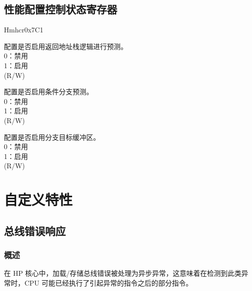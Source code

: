 \documentclass[main\_\_CN.tex]{subfiles}
\begin{document}
 \subsection{性能配置控制状态寄存器}
\label{sec:riscvcpu-perf-csr}
\begin{register}{H}{mhcr}{0x7C1}\label{regdesc:MHCR}
%
%
%
%
%
%
\regnewline%
\begin{regdesc}\begin{reglist}
\label{fielddesc:MHCRRS}\item [RS] 配置是否启用返回地址栈逻辑进行预测。\\
0：禁用 \\
1：启用 \\
(R/W)
\label{fielddesc:MHCRBPE}\item [BPE] 配置是否启用条件分支预测。\\
0：禁用 \\
1：启用 \\
(R/W)
\label{fielddesc:MHCRBTB}\item [BTB]配置是否启用分支目标缓冲区。\\
0：禁用 \\
1：启用 \\
(R/W)
\end{reglist}\end{regdesc}
\end{register}
\newpage
\section{自定义特性}


\subsection{总线错误响应}
\label{sec:riscvcpu-bus-err-resp}
\subsubsection{概述}
\label{sec:riscvcpu-buserr-overview}

在 HP 核心中，加载/存储总线错误被处理为异步异常，这意味着在检测到此类异常时，CPU 可能已经执行了引起异常的指令之后的部分指令。
\end{document}
